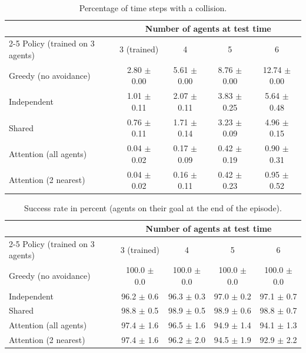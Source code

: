 \begin{table}[t]
  \centering\small
  \caption{Percentage of time steps with a collision.}
  \label{tab:pt-violation}
\begin{tabular}{l cccc}
\toprule
 & \multicolumn{4}{c}{Number of agents at test time} \\
\cmidrule(lr){2-5}
Policy (trained on 3 agents) & 3 (trained) & 4 & 5 & 6 \\
\midrule
Greedy (no avoidance) & 2.80 $\pm$ 0.00 & 5.61 $\pm$ 0.00 & 8.76 $\pm$ 0.00 & 12.74 $\pm$ 0.00 \\
\midrule
Independent & 1.01 $\pm$ 0.11 & 2.07 $\pm$ 0.11 & 3.83 $\pm$ 0.25 & 5.64 $\pm$ 0.48 \\
Shared & 0.76 $\pm$ 0.11 & 1.71 $\pm$ 0.14 & 3.23 $\pm$ 0.09 & 4.96 $\pm$ 0.15 \\
Attention (all agents) & 0.04 $\pm$ 0.02 & 0.17 $\pm$ 0.09 & 0.42 $\pm$ 0.19 & 0.90 $\pm$ 0.31 \\
Attention (2 nearest) & 0.04 $\pm$ 0.02 & 0.16 $\pm$ 0.11 & 0.42 $\pm$ 0.23 & 0.95 $\pm$ 0.52 \\
\bottomrule
\end{tabular}
\end{table}

\begin{table}[t]
  \centering\small
  \caption{Success rate in percent (agents on their goal at the end of the episode).}
  \label{tab:pt-success}
\begin{tabular}{l cccc}
\toprule
 & \multicolumn{4}{c}{Number of agents at test time} \\
\cmidrule(lr){2-5}
Policy (trained on 3 agents) & 3 (trained) & 4 & 5 & 6 \\
\midrule
Greedy (no avoidance) & 100.0 $\pm$ 0.0 & 100.0 $\pm$ 0.0 & 100.0 $\pm$ 0.0 & 100.0 $\pm$ 0.0 \\
\midrule
Independent & 96.2 $\pm$ 0.6 & 96.3 $\pm$ 0.3 & 97.0 $\pm$ 0.2 & 97.1 $\pm$ 0.7 \\
Shared & 98.8 $\pm$ 0.5 & 98.9 $\pm$ 0.5 & 98.9 $\pm$ 0.6 & 98.8 $\pm$ 0.7 \\
Attention (all agents) & 97.4 $\pm$ 1.6 & 96.5 $\pm$ 1.6 & 94.9 $\pm$ 1.4 & 94.1 $\pm$ 1.3 \\
Attention (2 nearest) & 97.4 $\pm$ 1.6 & 96.2 $\pm$ 2.0 & 94.5 $\pm$ 1.9 & 92.9 $\pm$ 2.2 \\
\midrule
\bottomrule
\end{tabular}
\end{table}

